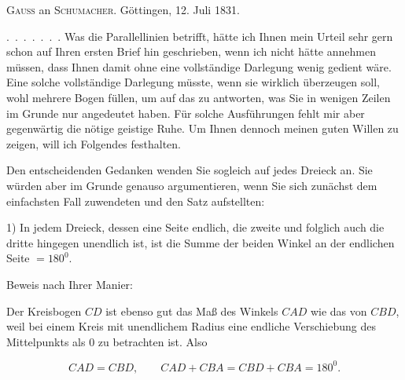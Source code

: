 

%
\begin{center}
\textsc{Gauss} an \textsc{Schumacher}. Göttingen, 12. Juli 1831.
\end{center}

\mbox{.\ .\ .\ .\ .\ .\ .} Was die Parallellinien betrifft, hätte ich Ihnen mein Urteil sehr gern schon auf Ihren ersten Brief hin geschrieben, wenn ich nicht hätte annehmen müssen, dass Ihnen damit ohne eine vollständige Darlegung wenig gedient wäre. Eine solche vollständige Darlegung müsste, wenn sie wirklich überzeugen soll, wohl mehrere Bogen füllen,
um auf das zu antworten, was Sie in wenigen Zeilen im Grunde nur angedeutet haben. Für solche Ausführungen fehlt mir aber gegenwärtig die nötige geistige Ruhe. Um Ihnen dennoch meinen guten Willen zu zeigen, will ich Folgendes festhalten.

Den entscheidenden Gedanken wenden Sie sogleich auf jedes Dreieck an. Sie würden aber im Grunde genauso argumentieren, wenn Sie sich zunächst dem einfachsten Fall zuwendeten und den Satz aufstellten:

1) In jedem Dreieck, dessen eine Seite endlich, die zweite und folglich auch die dritte hingegen unendlich ist, ist die Summe der beiden Winkel an der endlichen Seite $=180^0$.

\begin{center}

\end{center}

Beweis nach Ihrer Manier:

Der Kreisbogen $CD$ ist ebenso gut das Maß des Winkels $CAD$ wie das von $CBD$, weil bei einem Kreis mit unendlichem Radius eine endliche Verschiebung des Mittelpunkts als $0$ zu betrachten ist. Also

\[ CAD = CBD, \qquad CAD + CBA = CBD + CBA = 180^0. \]
